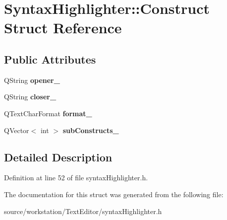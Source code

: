 \hypertarget{struct_syntax_highlighter_1_1_construct}{\section{Syntax\-Highlighter\-:\-:Construct Struct Reference}
\label{struct_syntax_highlighter_1_1_construct}
}
\subsection*{Public Attributes}
\begin{DoxyCompactItemize}
\item 
\hypertarget{struct_syntax_highlighter_1_1_construct_aab337a7cdead9c169b153439a68d63fd}{Q\-String {\bfseries opener\-\_\-}}\label{struct_syntax_highlighter_1_1_construct_aab337a7cdead9c169b153439a68d63fd}

\item 
\hypertarget{struct_syntax_highlighter_1_1_construct_ad265a2450a6da3b37bcfc34474c165bb}{Q\-String {\bfseries closer\-\_\-}}\label{struct_syntax_highlighter_1_1_construct_ad265a2450a6da3b37bcfc34474c165bb}

\item 
\hypertarget{struct_syntax_highlighter_1_1_construct_af22bbae616eb426d62d94c0d269ebc41}{Q\-Text\-Char\-Format {\bfseries format\-\_\-}}\label{struct_syntax_highlighter_1_1_construct_af22bbae616eb426d62d94c0d269ebc41}

\item 
\hypertarget{struct_syntax_highlighter_1_1_construct_ae3390750e7d529d5483a7c2f7e5a46c6}{Q\-Vector$<$ int $>$ {\bfseries sub\-Constructs\-\_\-}}\label{struct_syntax_highlighter_1_1_construct_ae3390750e7d529d5483a7c2f7e5a46c6}

\end{DoxyCompactItemize}


\subsection{Detailed Description}


Definition at line 52 of file syntax\-Highlighter.\-h.



The documentation for this struct was generated from the following file\-:\begin{DoxyCompactItemize}
\item 
source/workstation/\-Text\-Editor/syntax\-Highlighter.\-h\end{DoxyCompactItemize}
